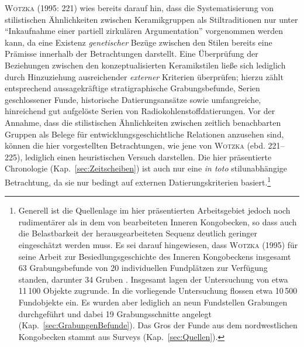 \textsc{Wotzka} (1995: 221) wies bereits darauf hin, dass die Systematisierung von stilistischen Ähnlichkeiten zwischen Keramikgruppen als Stiltraditionen nur unter \enquote{Inkaufnahme einer partiell zirkulären Argumentation} vorgenommen werden kann, da eine Existenz \textit{genetischer} Bezüge zwischen den Stilen bereits eine Prämisse innerhalb der Betrachtungen darstellt. Eine Überprüfung der Beziehungen zwischen den konzeptualisierten Keramikstilen ließe sich lediglich durch Hinzuziehung ausreichender \textit{externer} Kriterien überprüfen; hierzu zählt \textcite{Wotzka.1995} entsprechend aussagekräftige stratigraphische Grabungsbefunde, Serien geschlossener Funde, historische Datierungsansätze sowie umfangreiche, hinreichend gut aufgelöste Serien von Radiokohlenstoffdatierungen. Vor der Annahme, dass die stilistischen Ähnlichkeiten zwischen zeitlich benachbarten Gruppen als Belege für entwicklungsgeschichtliche Relationen anzusehen sind, können die hier vorgestellten Betrachtungen, wie jene von \textsc{Wotzka} (ebd. 221--225), lediglich einen heuristischen Versuch darstellen. Die hier präsentierte Chronologie (Kap.~\ref{sec:Zeitscheiben}) ist auch nur eine \textit{in toto} stilunabhängige Betrachtung, da sie nur bedingt auf externen Datierungskriterien basiert.\footnote{Generell ist die Quellenlage im hier präsentierten Arbeitsgebiet jedoch noch rudimentärer als in dem von \textcite{Wotzka.1995} bearbeiteten Inneren Kongobecken, so dass auch die Belastbarkeit der herausgearbeiteten Sequenz deutlich geringer eingeschätzt werden muss. Es sei darauf hingewiesen, dass \textsc{Wotzka} (1995) für seine Arbeit zur Besiedlungsgeschichte des Inneren Kongobeckens insgesamt 63 Grabungsbefunde von 20 individuellen Fundplätzen zur Verfügung standen, darunter 34 Gruben \parencite[siehe][]{Wotzka.1993}. Insgesamt lagen der Untersuchung von \textcite{Wotzka.1995} etwa 11\,100 Objekte zugrunde. In die vorliegende Untersuchung flossen etwa 10\,500 Fundobjekte ein. Es wurden aber lediglich an neun Fundstellen Grabungen durchgeführt und dabei 19 Grabungsschnitte angelegt (Kap.~\ref{sec:GrabungenBefunde}). Das Gros der Funde aus dem nordwestlichen Kongobecken stammt aus Surveys (Kap.~\ref{sec:Quellen}).}

